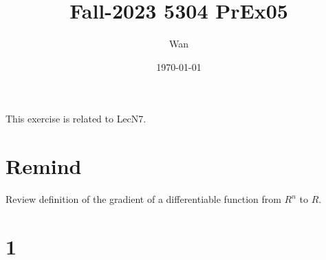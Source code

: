 \documentclass{article}
\begin{document}
\title{Fall-2023 5304 PrEx05}
\author{Wan}
\date{\today}
\maketitle

\noindent
This exercise is related to LecN7.

\section{Remind}
Review definition of the gradient of a differentiable
function from $R^n$ to $R$.\\


\section{1}
\end{document}
